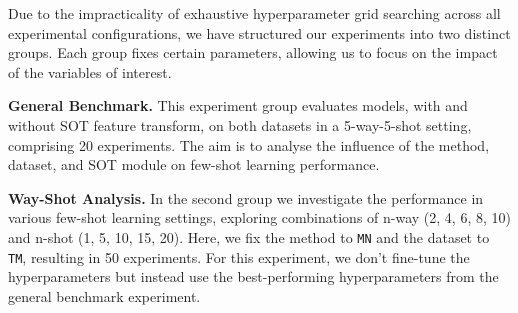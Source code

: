 Due to the impracticality of exhaustive hyperparameter grid searching across all experimental configurations, 
we have structured our experiments into two distinct groups. Each group fixes certain parameters, allowing us to focus on the impact of the variables of interest.

\textbf{General Benchmark.} This experiment group evaluates models, with and without SOT feature transform, on both datasets in a 5-way-5-shot setting, 
comprising 20 experiments. The aim is to analyse the influence of the method, dataset, and SOT module on few-shot learning performance.

\textbf{Way-Shot Analysis.} In the second group we investigate the performance in various few-shot learning settings, exploring combinations of n-way ({2, 4, 6, 8, 10}) and n-shot ({1, 5, 10, 15, 20}). Here, we fix the method to \texttt{MN} and the dataset to \texttt{TM}, resulting in 50 experiments. For this experiment, we don't fine-tune the hyperparameters but instead use the best-performing hyperparameters from the general benchmark experiment.